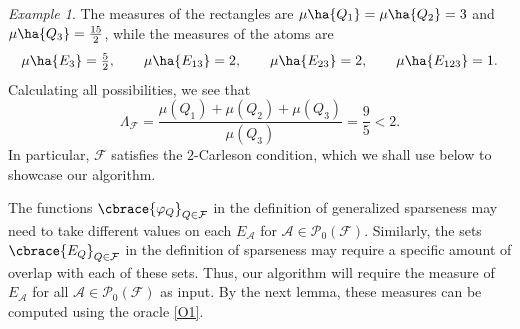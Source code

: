 \documentclass[a4paper, oneside,11pt]{amsart}
\theoremstyle{definition}
\theoremstyle{remark}
\newtheorem{example}[theorem]{Example}
\numberwithin{equation}{section}
\newcommand{\R}{\ensuremath{\mathbb{R}}}
\newcommand{\mc}{\mathcal}
\DeclarePairedDelimiter\cbrace\{\}
\DeclarePairedDelimiter\ha()
\begin{document}
\begin{example}
The measures of the rectangles are $\mu\ha{Q_1}=\mu\ha{Q_2}=3$ and $\mu\ha{Q_3}=\frac{15}{2}$, while the measures of the atoms are
\[
\mu\ha{E_3}=\tfrac52,\qquad \mu\ha{E_{13}}=2,\qquad
\mu\ha{E_{23}}=2,\qquad \mu\ha{E_{123}}=1.
\]
Calculating all possibilities, we see that
\begin{equation*}
  \Lambda_{\mc{F}}= \frac{\mu(Q_1)+\mu(Q_2)+\mu(Q_3)}{\mu(Q_3)} = \frac{9}{5}<2.
\end{equation*}
In particular, $\mc{F}$ satisfies the $2$-Carleson condition, which we shall use below to showcase our algorithm.
\end{example}


%

The functions $\cbrace{\varphi_Q}_{Q \in \mc{F}}$ in the definition of generalized sparseness may need to take different values on each $E_\mc{A}$ for $\mc{A} \in \mc{P}_0(\mc{F})$. Similarly, the sets $\cbrace{E_Q}_{Q \in \mc{F}}$ in the definition of sparseness may require a specific amount of overlap with each of these sets. Thus, our algorithm will require the measure of  $E_\mc{A}$ for all $\mc{A} \in \mc{P}_0(\mc{F})$ as input. By the next lemma, these measures can be computed using the oracle \ref{O1}.
\end{document}

